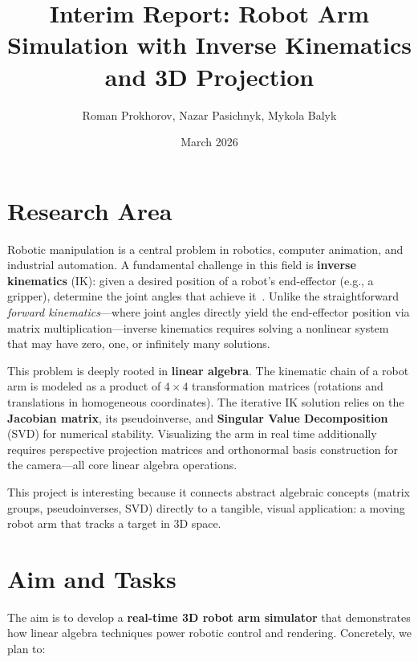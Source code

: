 \documentclass[11pt]{article}
\title{Interim Report: Robot Arm Simulation with Inverse Kinematics and 3D Projection}
\author{Roman Prokhorov, Nazar Pasichnyk, Mykola Balyk}
\date{March 2026}
\begin{document}
\maketitle

\section{Research Area}

Robotic manipulation is a central problem in robotics, computer animation, and industrial automation. A fundamental challenge in this field is \textbf{inverse kinematics} (IK): given a desired position of a robot's end-effector (e.g., a gripper), determine the joint angles that achieve it~\cite{mathworks}. Unlike the straightforward \textit{forward kinematics}---where joint angles directly yield the end-effector position via matrix multiplication---inverse kinematics requires solving a nonlinear system that may have zero, one, or infinitely many solutions.

This problem is deeply rooted in \textbf{linear algebra}. The kinematic chain of a robot arm is modeled as a product of $4 \times 4$ transformation matrices (rotations and translations in homogeneous coordinates). The iterative IK solution relies on the \textbf{Jacobian matrix}, its pseudoinverse, and \textbf{Singular Value Decomposition} (SVD) for numerical stability. Visualizing the arm in real time additionally requires perspective projection matrices and orthonormal basis construction for the camera---all core linear algebra operations.

This project is interesting because it connects abstract algebraic concepts (matrix groups, pseudoinverses, SVD) directly to a tangible, visual application: a moving robot arm that tracks a target in 3D space.

\section{Aim and Tasks}

The aim is to develop a \textbf{real-time 3D robot arm simulator} that demonstrates how linear algebra techniques power robotic control and rendering. Concretely, we plan to:
\end{document}
